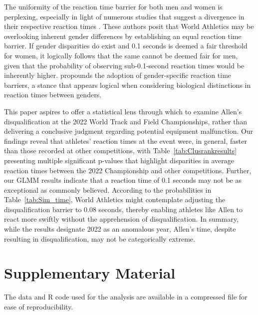 \documentclass[12pt, letterpaper]{article}
\begin{document}
The uniformity of the reaction time barrier for both men and women is
perplexing, especially in light of numerous studies that suggest a divergence in
their respective reaction times \citep[e.g.,][]{lipps2011implications,
  babicc2009reaction, panoutsakopoulos2020gender}. These authors posit that
World Athletics may be overlooking inherent gender differences by establishing
an equal reaction time barrier. If gender disparities do exist and 0.1 seconds
is deemed a fair threshold for women, it logically follows that the same cannot
be deemed fair for men, given that the probability of observing sub-0.1-second
reaction times would be inherently higher. \citet{brosnan2017effects} propounds
the adoption of gender-specific reaction time barriers, a stance that appears
logical when considering biological distinctions in reaction times between
genders.


This paper aspires to offer a statistical lens through which to examine Allen's
disqualification at the 2022 World Track and Field Championships, rather than
delivering a conclusive judgment regarding potential equipment malfunction. Our
findings reveal that athletes' reaction times at the event were, in general,
faster than those recorded at other competitions, with
Table~\ref{tab:Clusrankresults} presenting multiple significant p-values that
highlight disparities in average reaction times between the 2022 Championship
and other competitions. Further, our GLMM results indicate that a reaction time
of 0.1 seconds may not be as exceptional as commonly believed. According to the
probabilities in Table~\ref{tab:Sim_time}, World Athletics might contemplate
adjusting the disqualification barrier to 0.08 seconds, thereby enabling athletes
like Allen to react more swiftly without the apprehension of
disqualification. In summary, while the results designate 2022 as an anomalous
year, Allen's time, despite resulting in disqualification, may not be
categorically extreme.


\section*{Supplementary Material}
The data and R code used for the analysis are available in a compressed file for
ease of reproducibility.



\end{document}
